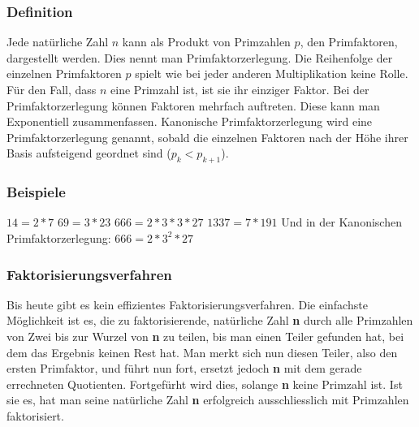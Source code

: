 \subsubsection{Definition}
Jede natürliche Zahl $n$ kann als Produkt von Primzahlen $p$, den Primfaktoren, dargestellt werden. Dies nennt man Primfaktorzerlegung. Die Reihenfolge der einzelnen Primfaktoren $p$ spielt wie bei jeder anderen Multiplikation keine Rolle. Für den Fall, dass $n$ eine Primzahl ist, ist sie ihr einziger Faktor. Bei der Primfaktorzerlegung können Faktoren mehrfach auftreten. Diese kann man Exponentiell zusammenfassen. Kanonische Primfaktorzerlegung wird eine Primfaktorzerlegung genannt, sobald die einzelnen Faktoren nach der Höhe ihrer Basis aufsteigend geordnet sind ($p_k < p_{k+1}$).
\subsubsection{Beispiele}
$14 = 2 * 7$\newline
$69 = 3 * 23$\newline
$666 = 2 * 3 * 3 * 27$\newline
$1337 = 7 * 191$\newline\newline
Und in der Kanonischen Primfaktorzerlegung:\newline\newline
$666 = 2 * 3^2 * 27$
\subsubsection{Faktorisierungsverfahren}
Bis heute gibt es kein effizientes Faktorisierungsverfahren. Die einfachste Möglichkeit ist es, die zu faktorisierende, natürliche Zahl \textbf{n} durch alle Primzahlen von Zwei bis zur Wurzel von \textbf{n} zu teilen, bis man einen Teiler gefunden hat, bei dem das Ergebnis keinen Rest hat. Man merkt sich nun diesen Teiler, also den ersten Primfaktor, und führt nun fort, ersetzt jedoch \textbf{n} mit dem gerade errechneten Quotienten. Fortgefürht wird dies, solange \textbf{n} keine Primzahl ist. Ist sie es, hat man seine natürliche Zahl \textbf{n} erfolgreich ausschliesslich mit Primzahlen faktorisiert.
